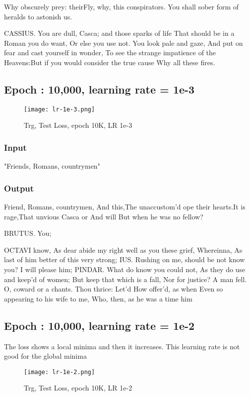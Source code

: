 \documentclass[conference]{IEEEtran}
\begin{document}
Why obscurely prey: theirFly, why, this conspirators. You shall sober form of heralds to astonish us.

CASSIUS. You are dull, Casca; and those sparks of life That should be in a Roman you do want, Or else you use not. You look pale and gaze, And put on fear and cast yourself in wonder, To see the strange impatience of the Heavens:But if you would consider the true cause Why all these fires.

\subsection{Epoch : 10,000, learning rate = 1e-3}
\begin{figure}[H]
    \centering
    \texttt{[image: lr-1e-3.png]}
    \caption{Trg, Test Loss, epoch 10K, LR 1e-3}
    \label{fig:epoch}
\end{figure}
\subsubsection{Input}
"Friends, Romans, countrymen"
\subsubsection{Output}
Friend, Romans, countrymen, And this,The unaccustom’d ope their hearts.It is rage,That unvious Casca or And will 
But when he was no fellow?

BRUTUS.
You; 

OCTAVI know,
As dear abide my right well as you these grief, Whereinna,
As last of him better of this very strong; IUS. Rushing on me, should be not know you? I will please him; PINDAR. What do know you could not, As they do use and keep’d of women;
But keep that which is a fall, Nor for justice?
A man fell. O, coward or a chants.
Thou thrice: Let’d How offer’d, as when Even so appearing to his wife to me, Who, then, as he was a time him

\subsection{Epoch : 10,000, learning rate = 1e-2}
The loss shows a local minima and then it increases. This learning rate is not good for the global minima
\begin{figure}[H]
    \centering
    \texttt{[image: lr-1e-2.png]}
    \caption{Trg, Test Loss, epoch 10K, LR 1e-2}
    \label{fig:epoch}
\end{figure}
\end{document}
